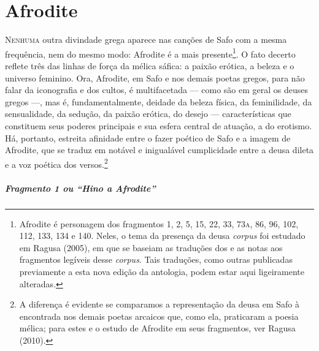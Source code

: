 \pagestyle{plain}



\chapter{Afrodite}

\textsc{Nenhuma} outra divindade grega aparece nas canções de Safo com a mesma
frequência, nem do mesmo modo: Afrodite é a mais presente\footnote{ Afrodite é
personagem dos fragmentos 1, 2, 5, 15, 22, 33, 73\textsc{a}, 86, 96, 102, 112, 133, 134
e 140. Neles, o tema da presença da deusa \textit{corpus} foi estudado em Ragusa (2005), em que se baseiam as traduções dos e as notas aos fragmentos legíveis desse \textit{corpus}. Tais traduções, como outras publicadas previamente a esta nova edição da antologia, podem estar aqui ligeiramente alteradas.}. O fato
decerto reflete três das linhas de força da mélica sáfica: a
paixão erótica, a beleza e o universo feminino. Ora, Afrodite, em Safo e nos
demais poetas gregos, para não falar da iconografia e dos cultos, é
multifacetada --- como são em geral os deuses gregos ---, mas é, fundamentalmente,
deidade da beleza física, da feminilidade, da sensualidade, da sedução, da
paixão erótica, do desejo --- características que constituem seus poderes
principais e sua esfera central de atuação, a do erotismo. Há, portanto,
estreita afinidade entre o fazer poético de Safo e a imagem de Afrodite, que se
traduz em notável e inigualável cumplicidade entre a deusa dileta e a voz
poética dos versos.\footnote{ A diferença é evidente se comparamos a
representação da deusa em Safo à encontrada nos demais poetas arcaicos que, como ela, praticaram a poesia mélica; para estes e o estudo de Afrodite em seus fragmentos, ver Ragusa (2010).}

\paragraph{Fragmento 1 ou “Hino a Afrodite”}

